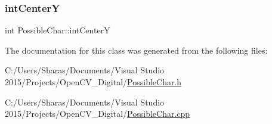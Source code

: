 \subsubsection{\texorpdfstring{int\+CenterY}{intCenterY}}
{\footnotesize\ttfamily int Possible\+Char\+::int\+CenterY}



The documentation for this class was generated from the following files\+:\begin{DoxyCompactItemize}
\item 
C\+:/\+Users/\+Sharas/\+Documents/\+Visual Studio 2015/\+Projects/\+Open\+C\+V\+\_\+\+Digital/\hyperlink{_possible_char_8h}{Possible\+Char.\+h}\item 
C\+:/\+Users/\+Sharas/\+Documents/\+Visual Studio 2015/\+Projects/\+Open\+C\+V\+\_\+\+Digital/\hyperlink{_possible_char_8cpp}{Possible\+Char.\+cpp}\end{DoxyCompactItemize}
